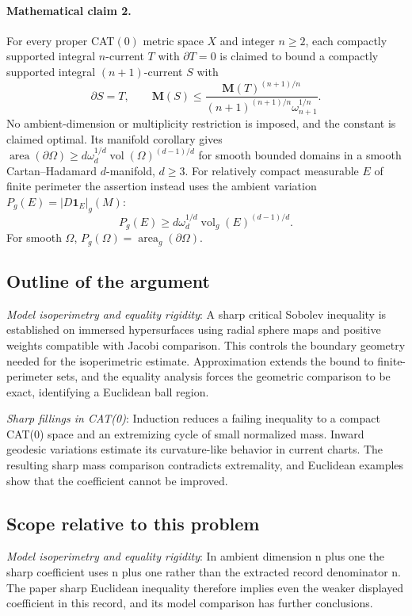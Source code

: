 \documentclass[11pt]{article}
\begin{document}
\paragraph{Mathematical claim 2.} For every proper CAT$(0)$ metric space $X$ and integer $n\ge2$, each compactly supported integral $n$-current $T$ with $\partial T=0$ is claimed to bound a compactly supported integral $(n+1)$-current $S$ with \[\partial S=T,\qquad\mathbf M(S)\le\frac{\mathbf M(T)^{(n+1)/n}}{(n+1)^{(n+1)/n}\omega_{n+1}^{1/n}}.\] No ambient-dimension or multiplicity restriction is imposed, and the constant is claimed optimal. Its manifold corollary gives $\operatorname{area}(\partial\Omega)\ge d\omega_d^{1/d}\operatorname{vol}(\Omega)^{(d-1)/d}$ for smooth bounded domains in a smooth Cartan--Hadamard $d$-manifold, $d\ge3$. For relatively compact measurable $E$ of finite perimeter the assertion instead uses the ambient variation $P_g(E)=|D\mathbf1_E|_g(M)$: \[P_g(E)\ge d\omega_d^{1/d}\operatorname{vol}_g(E)^{(d-1)/d}.\] For smooth $\Omega$, $P_g(\Omega)=\operatorname{area}_g(\partial\Omega)$.

\subsection{Outline of the argument}
\textit{Model isoperimetry and equality rigidity}: A sharp critical Sobolev inequality is established on immersed hypersurfaces using radial sphere maps and positive weights compatible with Jacobi comparison. This controls the boundary geometry needed for the isoperimetric estimate. Approximation extends the bound to finite-perimeter sets, and the equality analysis forces the geometric comparison to be exact, identifying a Euclidean ball region.

\textit{Sharp fillings in CAT(0)}: Induction reduces a failing inequality to a compact CAT(0) space and an extremizing cycle of small normalized mass. Inward geodesic variations estimate its curvature-like behavior in current charts. The resulting sharp mass comparison contradicts extremality, and Euclidean examples show that the coefficient cannot be improved.

\subsection{Scope relative to this problem}
\textit{Model isoperimetry and equality rigidity}: In ambient dimension n plus one the sharp coefficient uses n plus one rather than the extracted record denominator n. The paper sharp Euclidean inequality therefore implies even the weaker displayed coefficient in this record, and its model comparison has further conclusions.
\end{document}
